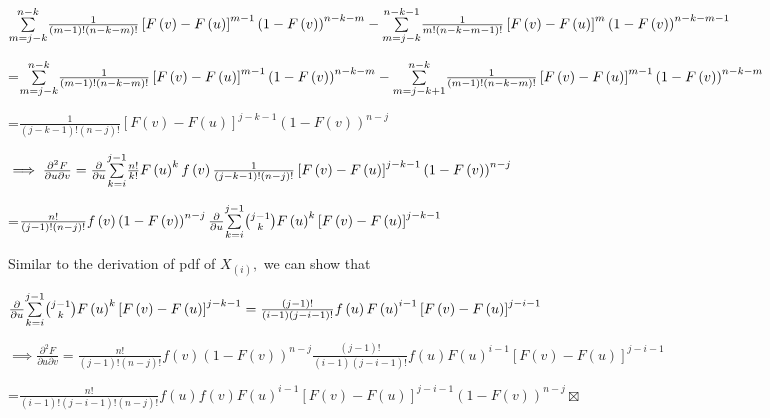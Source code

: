 \documentclass{article}
\begin{document}
$\underset{m=j-k}{\overset{n-k}{\sum }}\frac{1}{\left( m-1\right) !\left(
n-k-m\right) !}\left[ F\left( v\right) -F\left( u\right) \right]
^{m-1}\left( 1-F\left( v\right) \right) ^{n-k-m}-\underset{m=j-k}{\overset{%
n-k-1}{\sum }}\frac{1}{m!\left( n-k-m-1\right) !}\left[ F\left( v\right)
-F\left( u\right) \right] ^{m}\left( 1-F\left( v\right) \right) ^{n-k-m-1}$

=$\underset{m=j-k}{\overset{n-k}{\sum }}\frac{1}{\left( m-1\right) !\left(
n-k-m\right) !}\left[ F\left( v\right) -F\left( u\right) \right]
^{m-1}\left( 1-F\left( v\right) \right) ^{n-k-m}-\underset{m=j-k+1}{\overset{%
n-k}{\sum }}\frac{1}{\left( m-1\right) !\left( n-k-m\right) !}\left[ F\left(
v\right) -F\left( u\right) \right] ^{m-1}\left( 1-F\left( v\right) \right)
^{n-k-m}$

=$\frac{1}{\left( j-k-1\right) !\left( n-j\right) !}\left[ F\left( v\right)
-F\left( u\right) \right] ^{j-k-1}\left( 1-F\left( v\right) \right) ^{n-j}$

$\implies \frac{\partial ^{2}F}{\partial u\partial v}=\frac{\partial }{%
\partial u}\underset{k=i}{\overset{j-1}{\sum }}\frac{n!}{k!}F\left( u\right)
^{k}f\left( v\right) \frac{1}{\left( j-k-1\right) !\left( n-j\right) !}\left[
F\left( v\right) -F\left( u\right) \right] ^{j-k-1}\left( 1-F\left( v\right)
\right) ^{n-j}$

=$\frac{n!}{\left( j-1\right) !\left( n-j\right) !}f\left( v\right) \left(
1-F\left( v\right) \right) ^{n-j}\frac{\partial }{\partial u}\underset{k=i}{%
\overset{j-1}{\sum }}\binom{j-1}{k}F\left( u\right) ^{k}\left[ F\left(
v\right) -F\left( u\right) \right] ^{j-k-1}$

Similar to the derivation of pdf of $X_{\left( i\right) },$ we can show that

$\frac{\partial }{\partial u}\underset{k=i}{\overset{j-1}{\sum }}\binom{j-1}{%
k}F\left( u\right) ^{k}\left[ F\left( v\right) -F\left( u\right) \right]
^{j-k-1}=\frac{\left( j-1\right) !}{\left( i-1\right) \left( j-i-1\right) !}%
f\left( u\right) F\left( u\right) ^{i-1}\left[ F\left( v\right) -F\left(
u\right) \right] ^{j-i-1}$

$\implies \frac{\partial ^{2}F}{\partial u\partial v}=\frac{n!}{\left(
j-1\right) !\left( n-j\right) !}f\left( v\right) \left( 1-F\left( v\right)
\right) ^{n-j}\frac{\left( j-1\right) !}{\left( i-1\right) \left(
j-i-1\right) !}f\left( u\right) F\left( u\right) ^{i-1}\left[ F\left(
v\right) -F\left( u\right) \right] ^{j-i-1}$

=$\frac{n!}{\left( i-1\right) !\left( j-i-1\right) !\left( n-j\right) !}%
f\left( u\right) f\left( v\right) F\left( u\right) ^{i-1}\left[ F\left(
v\right) -F\left( u\right) \right] ^{j-i-1}\left( 1-F\left( v\right) \right)
^{n-j}\boxtimes $
\end{document}

